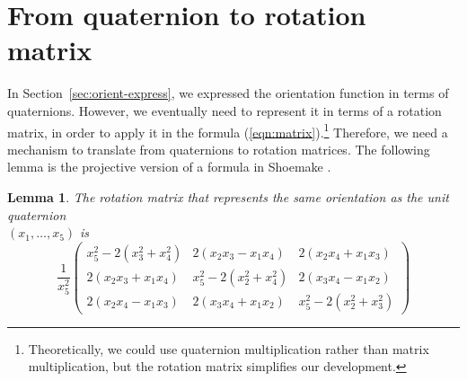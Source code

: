 \documentclass[times]{article}
\newcommand{\QED}{\vrule height 1.4ex width 1.0ex depth -.1ex\ } %
\newcommand{\prf}{\noindent{{\bf Proof} :\ }}
\newtheorem{lemma}{Lemma}[section]
\begin{document}
\section{From quaternion to rotation matrix}
\label{sec:q2rot}

In Section~\ref{sec:orient-express}, we expressed the orientation function in terms
of quaternions.
However, we eventually need to represent it in terms of a rotation matrix,
in order to apply it in the 
formula (\ref{eqn:matrix}).\footnote{Theoretically, we could use
	quaternion multiplication rather than matrix multiplication, but
	the rotation matrix simplifies our development.}
Therefore, we need a mechanism to translate from quaternions to
rotation matrices.
The following lemma is the projective version of a 
formula in Shoemake \cite{shoemake85}.


\begin{lemma}
\label{lem:qtorot}
The rotation matrix that represents the same orientation as the 
unit quaternion \\$(x_1,\ldots,x_5)$ is
\begin{equation}
	\frac{1}{x_5^2}
	\left( \begin{array}{ccc}
	x_5^2 - 2(x_3^2 + x_4^2)& 2(x_2x_3 - x_1x_4)	& 2(x_2x_4 + x_1x_3) \\
	2(x_2x_3 + x_1x_4)	& x_5^2-2(x_2^2 + x_4^2)& 2(x_3x_4 - x_1x_2) \\
	2(x_2x_4 - x_1x_3)	& 2(x_3x_4 + x_1x_2)	& x_5^2-2(x_2^2 + x_3^2)
	\end{array} \right)
\end{equation}
\end{lemma}
\end{document}
